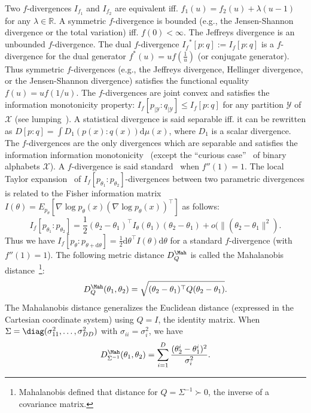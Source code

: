 \documentclass[11pt]{article}
\def\calY{\mathcal{Y}}
\def\dmu{\mathrm{d}\mu}
\def\calX{\mathcal{X}}
\def\bbR{\mathbb{R}}
\def\calX{\mathcal{X}}
\def\dmu{\mathrm{d}\mu}
\def\dtheta{\mathrm{d}\theta}
\begin{document}

 


Two $f$-divergences $I_{f_1}$ and $I_{f_2}$ are equivalent iff. $f_1(u)=f_2(u)+\lambda (u-1)$ for any $\lambda\in\bbR$.
A symmetric $f$-divergence is bounded (e.g., the Jensen-Shannon divergence or the total variation) iff. $f(0)<\infty$. 
The Jeffreys divergence is an unbounded $f$-divergence.
The dual $f$-divergence ${I_f}^*[p:q]:=I_f[p:q]$ is a $f$-divergence for the dual generator $f^*(u)= u f\left(\frac{1}{u}\right)$ (or conjugate generator).
Thus symmetric $f$-divergences (e.g., the Jeffreys divergence, Hellinger divergence, or the Jensen-Shannon divergence) satisfies the functional equality $f(u)=uf(1/u)$.
The $f$-divergences are joint convex and satisfies the information monotonicity property:
$I_f[p_{|\calY}:q_{|\calY}]\leq I_f[p:q]$ for any partition $\calY$ of $\calX$ (see lumping~\cite{TutorialCsiszar-2004}).
A statistical divergence is said separable iff. it can be rewritten as $D[p:q]=\int D_1(p(x):q(x)) \dmu(x)$, where $D_1$ is a scalar divergence. The $f$-divergences are the only divergences which are separable and satisfies the information information monotonicity~\cite{IG-2016} (except the ``curious case''~\cite{fdivBinaryAlphabet-2014} of binary alphabets $\calX$).
A $f$-divergence is said standard~\cite{IG-2016} when $f''(1)=1$. 
The local Taylor expansion~\cite{CharacterizationDiv-1998} of $I_f[p_{\theta_1}:p_{\theta_2}]$-divergences between two parametric divergences is related to the Fisher information matrix $I(\theta)=E_{p_\theta}\left[\nabla \log p_\theta(x) (\nabla \log p_\theta(x))^\top\right]$ as follows:
$$
I_f[p_{\theta_1}:p_{\theta_2}]=\frac{1}{2}(\theta_2-\theta_1)^\top I_\theta(\theta_1)(\theta_2-\theta_1)+o(\|(\theta_2-\theta_1\|^2).
$$ 
Thus we have $I_f[p_{\theta}:p_{\theta+\dtheta}]=\frac{1}{2}\dtheta^\top I(\theta) \dtheta$ for a standard $f$-divergence (with $f''(1)=1$).
The following metric distance $D^\Mah_Q$ is called the Mahalanobis distance~\cite{Mahalanobis-1936}\footnote{Mahalanobis defined that distance for $Q=\Sigma^{-1}\succ 0$, the inverse of a covariance matrix.}:
$$
D^\Mah_Q(\theta_1,\theta_2)=\sqrt{(\theta_2-\theta_1)^\top Q(\theta_2-\theta_1)}.
$$
The  Mahalanobis distance generalizes the Euclidean distance (expressed in the Cartesian coordinate system) using $Q=I$, the identity matrix.
When $\Sigma=\diag(\sigma_{11}^2,\ldots, \sigma_{DD}^2)$ with $\sigma_{ii}=\sigma_i^2$, we have
$$
D^\Mah_{\Sigma^{-1}}(\theta_1,\theta_2)=\sum_{i=1}^D \frac{(\theta_2^i-\theta_1^i)^2}{\sigma_{i}^2}.
$$
\end{document}
